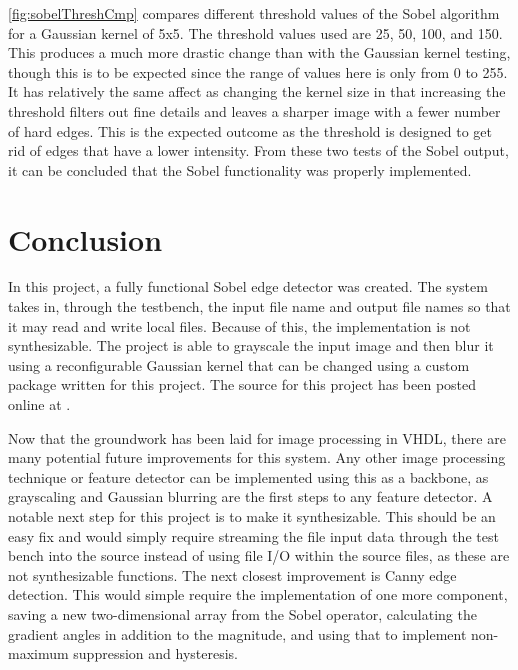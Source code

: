 \documentclass[12pt]{article}
\begin{document}
		\autoref{fig:sobelThreshCmp} compares different threshold values of the Sobel algorithm for a Gaussian kernel of 5x5. The threshold values used are 25, 50, 100, and 150. This produces a much more drastic change than with the Gaussian kernel testing, though this is to be expected since the range of values here is only from 0 to 255. It has relatively the same affect as changing the kernel size in that increasing the threshold filters out fine details and leaves a sharper image with a fewer number of hard edges. This is the expected outcome as the threshold is designed to get rid of edges that have a lower intensity. From these two tests of the Sobel output, it can be concluded that the Sobel functionality was properly implemented. 

	\section{Conclusion}
		\label{sec:conclusion}
		In this project, a fully functional Sobel edge detector was created. The system takes in, through the testbench, the input file name and output file names so that it may read and write local files. Because of this, the implementation is not synthesizable. The project is able to grayscale the input image and then blur it using a reconfigurable Gaussian kernel that can be changed using a custom package written for this project. The source for this project has been posted online at \cite{github}.

		Now that the groundwork has been laid for image processing in VHDL, there are many potential future improvements for this system. Any other image processing technique or feature detector can be implemented using this as a backbone, as grayscaling and Gaussian blurring are the first steps to any feature detector. A notable next step for this project is to make it synthesizable. This should be an easy fix and would simply require streaming the file input data through the test bench into the source instead of using file I/O within the source files, as these are not synthesizable functions. The next closest improvement is Canny edge detection. This would simple require the implementation of one more component, saving a new two-dimensional array from the Sobel operator, calculating the gradient angles in addition to the magnitude, and using that to implement non-maximum suppression and hysteresis. 
\end{document}
